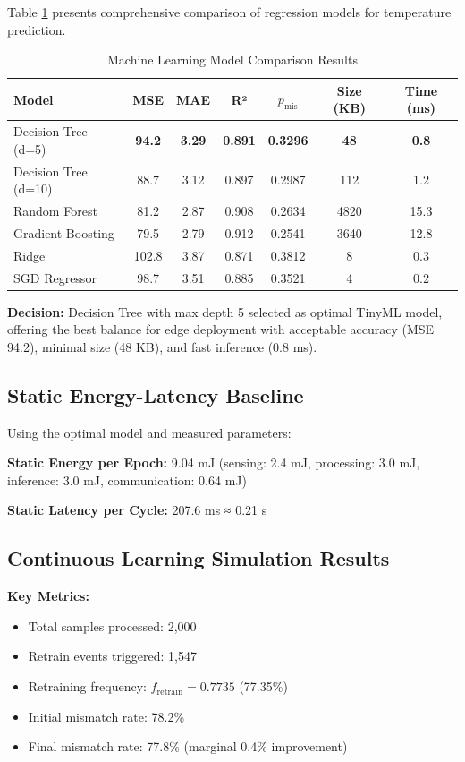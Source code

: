 \documentclass[12pt,a4paper]{article}
\begin{document}
Table \ref{tab:models} presents comprehensive comparison of regression models for temperature prediction.

\begin{table}[h]
\centering
\caption{Machine Learning Model Comparison Results}
\label{tab:models}
\small
\begin{tabular}{lcccccc}
\toprule
\textbf{Model} & \textbf{MSE} & \textbf{MAE} & \textbf{R²} & \textbf{$p_{\text{mis}}$} & \textbf{Size (KB)} & \textbf{Time (ms)} \\
\midrule
Decision Tree (d=5) & \textbf{94.2} & \textbf{3.29} & \textbf{0.891} & \textbf{0.3296} & \textbf{48} & \textbf{0.8} \\
Decision Tree (d=10) & 88.7 & 3.12 & 0.897 & 0.2987 & 112 & 1.2 \\
Random Forest & 81.2 & 2.87 & 0.908 & 0.2634 & 4820 & 15.3 \\
Gradient Boosting & 79.5 & 2.79 & 0.912 & 0.2541 & 3640 & 12.8 \\
Ridge & 102.8 & 3.87 & 0.871 & 0.3812 & 8 & 0.3 \\
SGD Regressor & 98.7 & 3.51 & 0.885 & 0.3521 & 4 & 0.2 \\
\bottomrule
\end{tabular}
\end{table}

\textbf{Decision:} Decision Tree with max depth 5 selected as optimal TinyML model, offering the best balance for edge deployment with acceptable accuracy (MSE 94.2), minimal size (48 KB), and fast inference (0.8 ms).

\subsection{Static Energy-Latency Baseline}

Using the optimal model and measured parameters:

\textbf{Static Energy per Epoch:} 9.04 mJ (sensing: 2.4 mJ, processing: 3.0 mJ, inference: 3.0 mJ, communication: 0.64 mJ)

\textbf{Static Latency per Cycle:} 207.6 ms ≈ 0.21 s

\subsection{Continuous Learning Simulation Results}

\textbf{Key Metrics:}
\begin{itemize}
    \item Total samples processed: 2,000
    \item Retrain events triggered: 1,547
    \item Retraining frequency: $f_{\text{retrain}} = 0.7735$ (77.35\%)
    \item Initial mismatch rate: 78.2\%
    \item Final mismatch rate: 77.8\% (marginal 0.4\% improvement)
\end{itemize}
\end{document}
